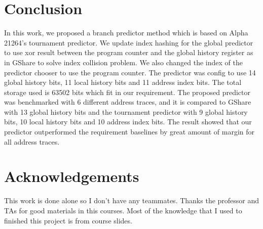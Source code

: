 \documentclass[conference]{IEEEtran}
\begin{document}
\section{Conclusion}

In this work, we proposed a branch predictor method which is based on Alpha 21264's tournament predictor.
We update index hashing for the global predictor to use xor result between the program counter and the global
history register as in GShare to solve index collision problem. We also changed the index of the predictor chooser
to use the program counter. The predictor was config to use 14 global history bits,
11 local history bits and 11 address index bits. The total storage used is 63502 bits which fit in our requirement.
The proposed predictor was benchmarked with 6 different address traces, and it is compared to
GShare with 13 global history bits and the tournament predictor with 9 global history bits, 10 local history bits
and 10 address index bits. The result showed that our predictor outperformed the requirement baselines
by great amount of margin for all address traces.

\section*{Acknowledgements}
This work is done alone so I don't have any teammates. Thanks the professor and TAs for good materials in this
courses. Most of the knowledge that I used to finished this project is from course slides.





\end{document}

